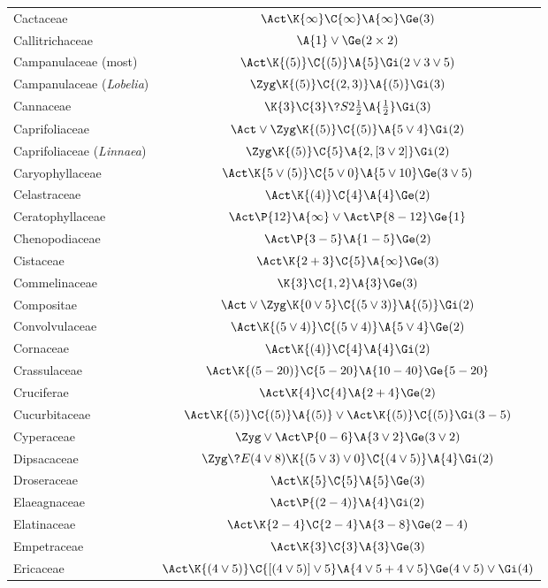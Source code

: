 \documentclass[12pt]{article}
\begin{document}
\begin{longtable}{lc}
Cactaceae & $\Act\K{\infty}\C{\infty}\A{\infty}\Ge(3)$\\[2pt]
Callitrichaceae & $\A{1}\vee\Ge(2\times2)$\\[2pt]
Campanulaceae (most) & $\Act\K{(5)}\C{(5)}\A{5}\Gi(2\vee3\vee5)$\\[2pt]
Campanulaceae (\textit{Lobelia}) & $\Zyg\K{(5)}\C{(2,3)}\A{(5)}\Gi(3)$\\[2pt]
Cannaceae & $\K{3}\C{3}\?{S}{2\frac{1}{2}}\A{\frac{1}{2}}\Gi(3)$\\[2pt]
Caprifoliaceae & $\Act\vee\Zyg\K{(5)}\C{(5)}\A{5\vee4}\Gi(2)$\\[2pt]
Caprifoliaceae (\textit{Linnaea}) & $\Zyg\K{(5)}\C{5}\A{2,[3\vee2]}\Gi(2)$\\[2pt]
Caryophyllaceae & $\Act\K{5\vee(5)}\C{5\vee0}\A{5\vee10}\Ge(3\vee5)$\\[2pt]
Celastraceae & $\Act\K{(4)}\C{4}\A{4}\Ge(2)$\\[2pt]
Ceratophyllaceae & $\Act\P{12}\A{\infty}\vee\Act\P{8-12}\Ge{1}$\\[2pt]
Chenopodiaceae & $\Act\P{3-5}\A{1-5}\Ge(2)$\\[2pt]
Cistaceae & $\Act\K{2+3}\C{5}\A{\infty}\Ge(3)$\\[2pt]
Commelinaceae & $\K{3}\C{1,2}\A{3}\Ge(3)$\\[2pt]
Compositae & $\Act\vee\Zyg\K{0\vee5}\C{(5\vee3)}\A{(5)}\Gi(2)$\\[2pt]
Convolvulaceae & $\Act\K{(5\vee4)}\C{(5\vee4)}\A{5\vee4}\Ge(2)$\\[2pt]
Cornaceae & $\Act\K{(4)}\C{4}\A{4}\Gi(2)$\\[2pt]
Crassulaceae & $\Act\K{(5-20)}\C{5-20}\A{10-40}\Ge{5-20}$\\[2pt]
Cruciferae & $\Act\K{4}\C{4}\A{2+4}\Ge(2)$\\[2pt]
Cucurbitaceae & $\Act\K{(5)}\C{(5)}\A{(5)}\vee\Act\K{(5)}\C{(5)}\Gi(3-5)$\\[2pt]
Cyperaceae & $\Zyg\vee\Act\P{0-6}\A{3\vee2}\Ge(3\vee2)$\\[2pt]
Dipsacaceae & $\Zyg\?{E}{(4\vee8)}\K{(5\vee3)\vee0}\C{(4\vee5)}\A{4}\Gi(2)$\\[2pt]
Droseraceae & $\Act\K{5}\C{5}\A{5}\Ge(3)$\\[2pt]
Elaeagnaceae & $\Act\P{(2-4)}\A{4}\Gi(2)$\\[2pt]
Elatinaceae & $\Act\K{2-4}\C{2-4}\A{3-8}\Ge(2-4)$\\[2pt]
Empetraceae & $\Act\K{3}\C{3}\A{3}\Ge(3)$\\[2pt]
Ericaceae & $\Act\K{(4\vee5)}\C{[(4\vee5)]\vee5}\A{4\vee5+4\vee5}\Ge(4\vee5)\vee\Gi(4)$\\[2pt]

\end{longtable}
\end{document}
